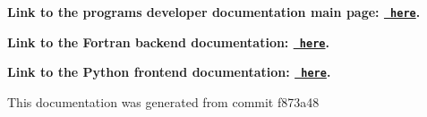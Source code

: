 {\bfseries{Link to the program\textquotesingle{}s developer documentation main page\+: \href{https://joegilkes.github.io/PX915-Docs/}{\texttt{ here}}.}}

{\bfseries{Link to the Fortran backend documentation\+: \href{https://joegilkes.github.io/PX915-Docs/fortran/docs/index.html}{\texttt{ here}}.}}

{\bfseries{Link to the Python frontend documentation\+: \href{https://joegilkes.github.io/PX915-Docs/python/docs/index.html}{\texttt{ here}}.}}

This documentation was generated from commit f873a48 